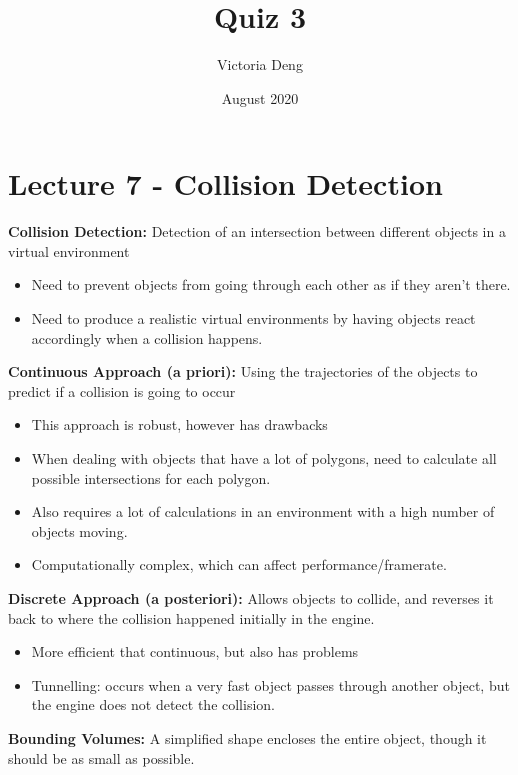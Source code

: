 \documentclass[a4paper,10pt]{article}
\title{Quiz 3}
\author {Victoria Deng}
\date{\small August 2020}
\begin{document}
\maketitle
\section*{Lecture 7 - Collision Detection}
\textcolor{Melon}{\textbf{Collision Detection:}} Detection of an intersection between different objects in a virtual environment
\renewcommand{\labelitemi}{\textperiodcentered}
\begin{itemize}
\item Need to prevent objects from going through each other as if they aren't there.  
\item Need to produce a realistic virtual environments by having objects react accordingly when a collision happens. \\
\end{itemize}
\textcolor{Melon}{\textbf{Continuous Approach (a priori):}} Using the trajectories of the objects to predict if a collision is going to occur
\renewcommand{\labelitemi}{\textperiodcentered}
\begin{itemize}
\item This approach is robust, however has drawbacks 
\item When dealing with objects that have a lot of polygons, need to calculate all possible intersections for each polygon. 
\item Also requires a lot of calculations in an environment with a high number of objects moving. 
\item Computationally complex, which can affect performance/framerate. \\
\end{itemize}
\textcolor{Melon}{\textbf{Discrete Approach (a posteriori):}} Allows objects to collide, and reverses it back to where the collision happened initially in the engine. 
\renewcommand{\labelitemi}{\textperiodcentered}
\begin{itemize}
\item More efficient that continuous, but also has problems 
\item \textcolor{Melon}{Tunnelling:} occurs when a very fast object passes through another object, but the engine does not detect the collision. \\
\end{itemize}
\textcolor{Melon}{\textbf{Bounding Volumes:}} A simplified shape encloses the entire object, though it should be as small as possible. \\\\
\end{document}
